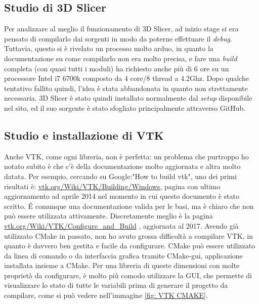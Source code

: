 \subsection{Studio di 3D Slicer}
Per analizzare al meglio il funzionamento di 3D Slicer, ad inizio stage si era pensato di compilarlo dai sorgenti in modo da poterne effettuare il \emph{debug}. Tuttavia, questo si è rivelato un processo molto arduo, in quanto la documentazione su come compilarlo non era molto precisa, e fare una \emph{build} completa (con quasi tutti i moduli) ha richiesto anche più di 6 ore su un processore Intel i7 6700k composto da 4 core/8 thread a 4.2Ghz. Dopo qualche tentativo fallito quindi, l'idea è stata abbandonata in quanto non strettamente necessaria. 3D Slicer è stato quindi installato normalmente dal \emph{setup} disponibile nel sito, ed il suo sorgente è stato sfogliato principalmente attraverso GitHub.

\subsection{Studio e installazione di VTK}
Anche VTK, come ogni libreria, non è perfetta: un problema che purtroppo ho notato subito è che c'è della documentazione molto aggiornata e altra molto datata. Per esempio, cercando su Google:"How to build vtk", uno dei primi risultati è: \href{https://vtk.org/Wiki/VTK/Building/Windows}{vtk.org/Wiki/VTK/Building/Windows}, pagina con ultimo aggiornamento ad aprile 2014 nel momento in cui questo documento è stato scritto. \'E comunque una documentazione valida per le basi, ma è chiaro che non può essere utilizzata attivamente. Discretamente meglio è la pagina \href{https://vtk.org/Wiki/VTK/Configure_and_Build}{vtk.org/Wiki/VTK/Configure\_and\_Build} , aggiornata al 2017. Avendo già utilizzato CMake in passato, non ho avuto grossa difficoltà a compilare VTK, in quanto è davvero ben gestita e facile da configurare. CMake può essere utilizzato da linea di comando o da interfaccia grafica tramite CMake-gui, applicazione installata insieme a CMake. Per una libreria di queste dimensioni con molte proprietà da configurare, è molto più comodo utilizzare la GUI, che permette di visualizzare lo stato di tutte le variabili prima di generare il progetto da compilare, come si può vedere nell'immagine \ref{fig: VTK CMAKE}.


